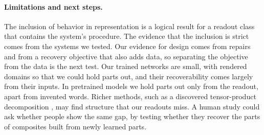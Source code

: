 \paragraph{Limitations and next steps.} The inclusion of behavior in representation is a logical result for a readout class that contains the system's procedure. The evidence that the inclusion is strict comes from the systems we tested. Our evidence for design comes from repairs and from a recovery objective that also adds data, so separating the objective from the data is the next test. Our trained networks are small, with rendered domains so that we could hold parts out, and their recoverability comes largely from their inputs. In pretrained models we hold parts out only from the readout, apart from invented words. Richer methods, such as a discovered tensor-product decomposition \citep{mccoy2019}, may find structure that our readouts miss. A human study could ask whether people show the same gap, by testing whether they recover the parts of composites built from newly learned parts.

